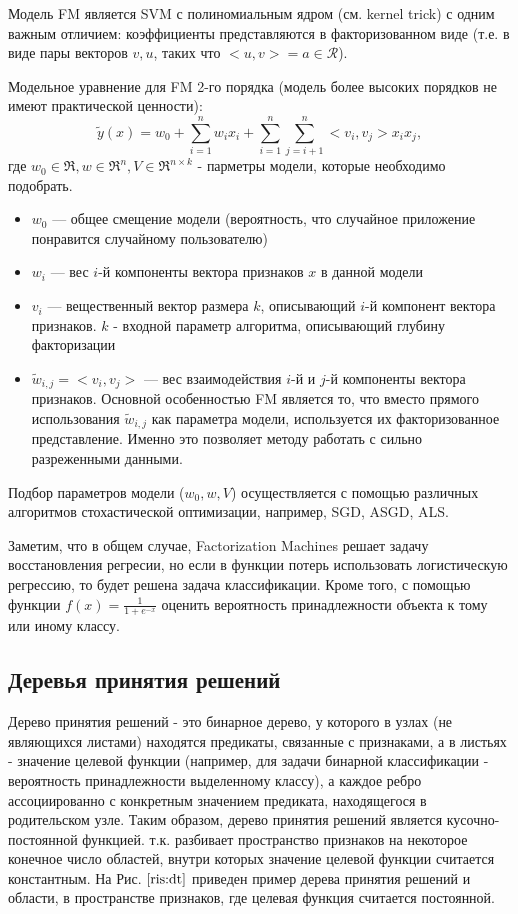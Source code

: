 \documentclass[12pt,a4paper]{report}
\begin{document}
Модель FM является SVM с полиномиальным ядром (см. kernel trick) с одним важным отличием: коэффициенты представляются в факторизованном виде (т.е. в виде пары векторов $v, u$, таких что $<u,v> = a \in \mathcal{R}$).

Модельное уравнение для FM 2-го порядка (модель более высоких порядков не имеют практической ценности):
\begin{equation}
\tilde{y}(x) = w_0 + \sum_{i=1}^{n}w_ix_i + \sum_{i=1}^{n}\sum_{j=i+1}^{n}<v_i, v_j>x_ix_j,
\end{equation}
где $w_0 \in \mathfrak{R}, w \in \mathfrak{R}^n, V \in \mathfrak{R}^{n \times k}$ - парметры модели, которые необходимо подобрать.
\begin{itemize}
\item $w_0$ --- общее смещение модели (вероятность, что случайное приложение понравится случайному пользователю)
\item $w_i$ --- вес $i$-й компоненты вектора признаков $x$ в данной модели
\item $v_i$ --- вещественный вектор размера $k$, описывающий $i$-й компонент вектора признаков. $k$ -  входной параметр алгоритма, описывающий глубину факторизации
\item $\tilde{w}_{i,j} = <v_i, v_j>$ --- вес взаимодействия $i$-й и $j$-й компоненты вектора признаков. Основной особенностью FM является то, что вместо прямого использования $\tilde{w}_{i,j}$ как параметра модели, используется их факторизованное представление. Именно это позволяет методу работать с сильно разреженными данными.
\end{itemize}

Подбор параметров модели ($w_0, w, V$) осуществляется с помощью различных алгоритмов стохастической оптимизации, например, SGD, ASGD, ALS.

Заметим, что в общем случае, Factorization Machines решает задачу восстановления регресии, но если в функции потерь использовать логистическую регрессию, то будет решена задача классификации. Кроме того, с помощью функции $f(x) = \frac{1}{1 + e^{-x}}$ оценить вероятность принадлежности объекта к тому или иному классу.

\subsection{Деревья принятия решений}
Дерево принятия решений - это бинарное дерево, у которого в узлах (не являющихся листами) находятся предикаты, связанные с признаками, а в листьях - значение целевой функции (например, для задачи бинарной классификации - вероятность принадлежности выделенному классу), а каждое ребро ассоциированно с конкретным значением предиката, находящегося в родительском узле.
Таким образом, дерево принятия решений является кусочно-постоянной функцией. т.к. разбивает пространство признаков на некоторое конечное число областей, внутри которых значение целевой функции считается константным. На Рис. $\ref{ris:dt}$ приведен пример дерева принятия решений и области, в пространстве признаков, где целевая функция считается постоянной.
\end{document}
